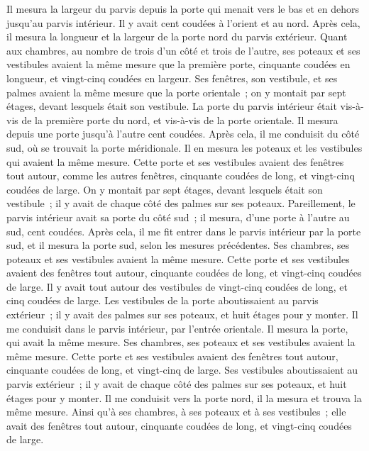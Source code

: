 \begin{multicols}{2}
Il mesura la largeur du parvis depuis la porte qui menait vers le bas et en dehors jusqu'au parvis intérieur. Il y avait cent coudées à l'orient et au nord.
Après cela, il mesura la longueur et la largeur de la porte nord du parvis extérieur.
Quant aux chambres, au nombre de trois d'un côté et trois de l'autre, ses poteaux et ses vestibules avaient la même mesure que la première porte, cinquante coudées en longueur, et vingt-cinq coudées en largeur.
Ses fenêtres, son vestibule, et ses palmes avaient la même mesure que la porte orientale~; on y montait par sept étages, devant lesquels était son vestibule.
La porte du parvis intérieur était vis-à-vis de la première porte du nord, et vis-à-vis de la porte orientale. Il mesura depuis une porte jusqu'à l'autre cent coudées.
Après cela, il me conduisit du côté sud, où se trouvait la porte méridionale. Il en mesura les poteaux et les vestibules qui avaient la même mesure.
Cette porte et ses vestibules avaient des fenêtres tout autour, comme les autres fenêtres, cinquante coudées de long, et vingt-cinq coudées de large.
On y montait par sept étages, devant lesquels était son vestibule~; il y avait de chaque côté des palmes sur ses poteaux.
Pareillement, le parvis intérieur avait sa porte du côté sud~; il mesura, d'une porte à l'autre au sud, cent coudées.
Après cela, il me fit entrer dans le parvis intérieur par la porte sud, et il mesura la porte sud, selon les mesures précédentes.
Ses chambres, ses poteaux et ses vestibules avaient la même mesure. Cette porte et ses vestibules avaient des fenêtres tout autour, cinquante coudées de long, et vingt-cinq coudées de large.
Il y avait tout autour des vestibules de vingt-cinq coudées de long, et cinq coudées de large.
Les vestibules de la porte aboutissaient au parvis extérieur~; il y avait des palmes sur ses poteaux, et huit étages pour y monter.
Il me conduisit dans le parvis intérieur, par l'entrée orientale. Il mesura la porte, qui avait la même mesure.
Ses chambres, ses poteaux et ses vestibules avaient la même mesure. Cette porte et ses vestibules avaient des fenêtres tout autour, cinquante coudées de long, et vingt-cinq de large.
Ses vestibules aboutissaient au parvis extérieur~; il y avait de chaque côté des palmes sur ses poteaux, et huit étages pour y monter.
Il me conduisit vers la porte nord, il la mesura et trouva la même mesure.
Ainsi qu'à ses chambres, à ses poteaux et à ses vestibules~; elle avait des fenêtres tout autour, cinquante coudées de long, et vingt-cinq coudées de large.

\end{multicols}

